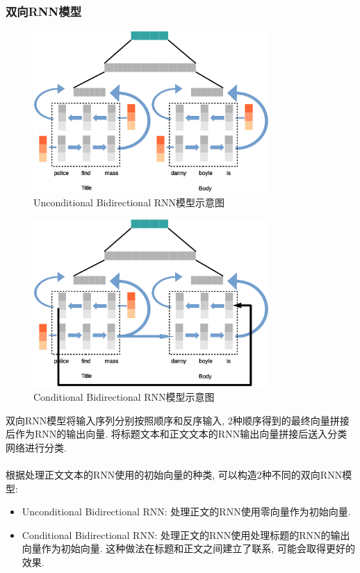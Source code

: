 \documentclass[a4paper]{article}
\begin{document}
	\subsubsection{双向RNN模型}
	\begin{figure}[H]
		\centering
		\includegraphics[width=0.8\textwidth]{birnn.eps}
		\caption{Unconditional Bidirectional RNN模型示意图}
		\label{birnn}
	\end{figure}
	\begin{figure}[H]
		\centering
		\includegraphics[width=0.8\textwidth]{birnn_cond.eps}
		\caption{Conditional Bidirectional RNN模型示意图}
		\label{birnn_cond}
	\end{figure}
	双向RNN模型将输入序列分别按照顺序和反序输入, 2种顺序得到的最终向量拼接后作为RNN的输出向量. 将标题文本和正文文本的RNN输出向量拼接后送入分类网络进行分类.\\\\
	根据处理正文文本的RNN使用的初始向量的种类, 可以构造2种不同的双向RNN模型:
	\begin{itemize}
		\item Unconditional Bidirectional RNN: 处理正文的RNN使用零向量作为初始向量.
		\item Conditional Bidirectional RNN: 处理正文的RNN使用处理标题的RNN的输出向量作为初始向量. 这种做法在标题和正文之间建立了联系, 可能会取得更好的效果.
	\end{itemize}
\end{document}
